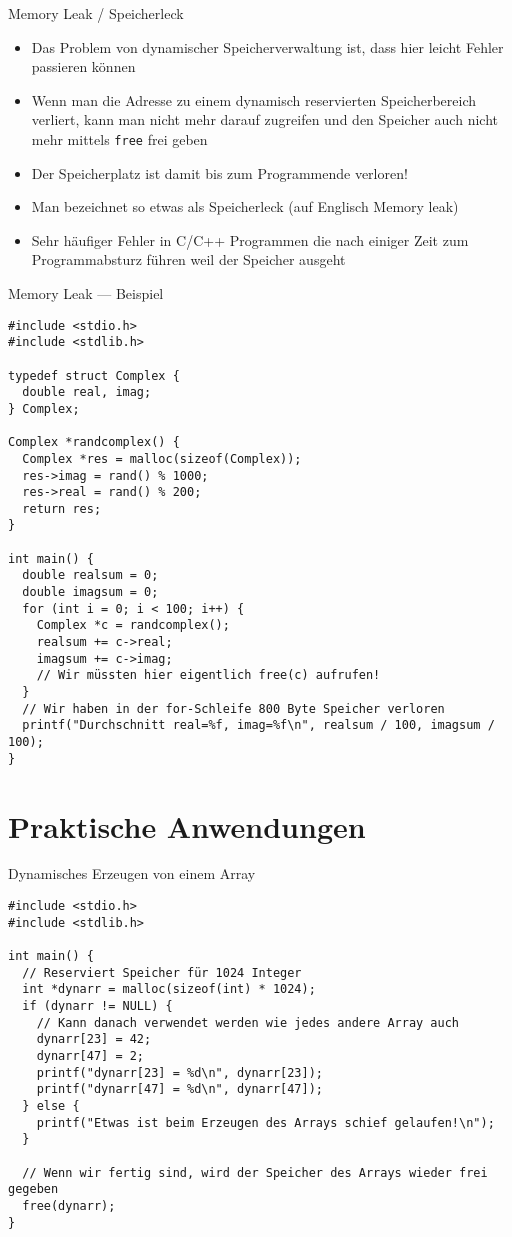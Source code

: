 \documentclass[presentation]{beamer}
\begin{document}
\begin{frame}[label={sec:org5f43cd3},fragile]{Memory Leak / Speicherleck}
 \begin{itemize}
\item Das Problem von dynamischer Speicherverwaltung ist, dass hier leicht
Fehler passieren können
\item Wenn man die Adresse zu einem dynamisch reservierten Speicherbereich
verliert, kann man \alert{nicht mehr darauf zugreifen} und den Speicher
auch \alert{nicht mehr mittels {\color{solarizedYellow}\texttt{free}} frei geben}
\item Der Speicherplatz ist damit \alert{bis zum Programmende verloren}!
\item Man bezeichnet so etwas als Speicherleck (auf Englisch Memory leak)
\item Sehr \alert{häufiger Fehler} in C/C++ Programmen die nach einiger Zeit zum
\alert{Programmabsturz} führen weil der \alert{Speicher ausgeht}
\end{itemize}
\end{frame}
\begin{frame}[label={sec:org39b9bed},fragile]{Memory Leak --- Beispiel}
 \begin{verbatim}
#include <stdio.h>
#include <stdlib.h>

typedef struct Complex {
  double real, imag;
} Complex;

Complex *randcomplex() {
  Complex *res = malloc(sizeof(Complex));
  res->imag = rand() % 1000;
  res->real = rand() % 200;
  return res;
}

int main() {
  double realsum = 0;
  double imagsum = 0;
  for (int i = 0; i < 100; i++) {
    Complex *c = randcomplex();
    realsum += c->real;
    imagsum += c->imag;
    // Wir müssten hier eigentlich free(c) aufrufen!
  }
  // Wir haben in der for-Schleife 800 Byte Speicher verloren
  printf("Durchschnitt real=%f, imag=%f\n", realsum / 100, imagsum / 100);
}
\end{verbatim}
\end{frame}

\section{Praktische Anwendungen}
\label{sec:org149d836}
\begin{frame}[label={sec:orgd68839b},fragile]{Dynamisches Erzeugen von einem Array}
 \begin{verbatim}
#include <stdio.h>
#include <stdlib.h>

int main() {
  // Reserviert Speicher für 1024 Integer
  int *dynarr = malloc(sizeof(int) * 1024);
  if (dynarr != NULL) {
    // Kann danach verwendet werden wie jedes andere Array auch
    dynarr[23] = 42;
    dynarr[47] = 2;
    printf("dynarr[23] = %d\n", dynarr[23]);
    printf("dynarr[47] = %d\n", dynarr[47]);
  } else {
    printf("Etwas ist beim Erzeugen des Arrays schief gelaufen!\n");
  }

  // Wenn wir fertig sind, wird der Speicher des Arrays wieder frei gegeben
  free(dynarr);
}
\end{verbatim}
\end{frame}
\end{document}
